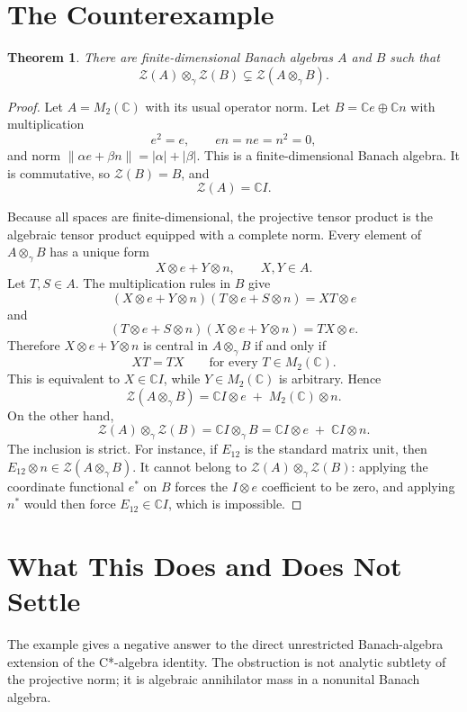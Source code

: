 \documentclass[11pt]{article}
\newtheorem{theorem}{Theorem}
\newcommand{\C}{\mathbb C}
\newcommand{\Z}{\mathcal Z}
\newcommand{\otg}{\otimes_\gamma}
\begin{document}
\section*{The Counterexample}

\begin{theorem}
There are finite-dimensional Banach algebras \(A\) and \(B\) such that
\[
  \Z(A)\otg\Z(B) \subsetneq \Z(A\otg B).
\]
\end{theorem}

\begin{proof}
Let \(A=M_2(\C)\) with its usual operator norm. Let \(B=\C e\oplus \C n\) with
multiplication
\[
  e^2=e,\qquad en=ne=n^2=0,
\]
and norm \(\|\alpha e+\beta n\|=|\alpha|+|\beta|\). This is a
finite-dimensional Banach algebra. It is commutative, so \(\Z(B)=B\), and
\[
  \Z(A)=\C I.
\]

Because all spaces are finite-dimensional, the projective tensor product is the
algebraic tensor product equipped with a complete norm. Every element of
\(A\otg B\) has a unique form
\[
  X\otimes e+Y\otimes n,\qquad X,Y\in A.
\]
Let \(T,S\in A\). The multiplication rules in \(B\) give
\[
  (X\otimes e+Y\otimes n)(T\otimes e+S\otimes n)=XT\otimes e
\]
and
\[
  (T\otimes e+S\otimes n)(X\otimes e+Y\otimes n)=TX\otimes e.
\]
Therefore \(X\otimes e+Y\otimes n\) is central in \(A\otg B\) if and only if
\[
  XT=TX\qquad\text{for every }T\in M_2(\C).
\]
This is equivalent to \(X\in\C I\), while \(Y\in M_2(\C)\) is arbitrary. Hence
\[
  \Z(A\otg B)=\C I\otimes e\;+\;M_2(\C)\otimes n.
\]
On the other hand,
\[
  \Z(A)\otg\Z(B)=\C I\otg B
  =\C I\otimes e\;+\;\C I\otimes n.
\]
The inclusion is strict. For instance, if \(E_{12}\) is the standard matrix
unit, then \(E_{12}\otimes n\in\Z(A\otg B)\). It cannot belong to
\(\Z(A)\otg\Z(B)\): applying the coordinate functional \(e^*\) on \(B\) forces
the \(I\otimes e\) coefficient to be zero, and applying \(n^*\) would then force
\(E_{12}\in\C I\), which is impossible.
\end{proof}

\section*{What This Does and Does Not Settle}

The example gives a negative answer to the direct unrestricted Banach-algebra
extension of the C*-algebra identity. The obstruction is not analytic subtlety
of the projective norm; it is algebraic annihilator mass in a nonunital Banach
algebra.
\end{document}
